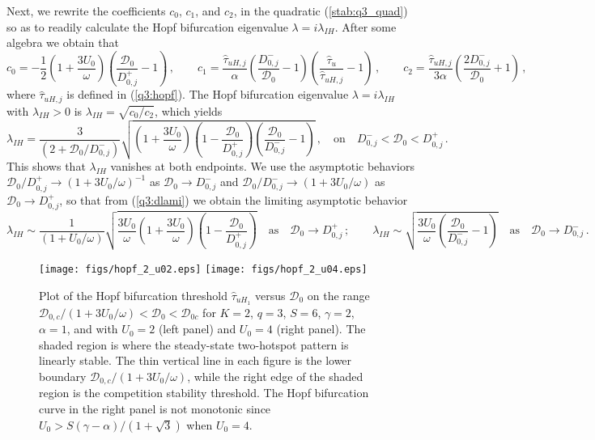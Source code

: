 \documentclass{article}%
\newcommand{\dzjp}{D^{+}_{0,j}}
\newcommand{\dzjm}{D^{-}_{0,j}}
\begin{document}
Next, we rewrite the coefficients $c_0$, $c_1$, and $c_2$, in the
quadratic (\ref{stab:q3_quad}) so as to readily calculate the Hopf
bifurcation eigenvalue $\lambda=i\lambda_{IH}$. After some algebra we
obtain that
\begin{equation}\label{q3:new_c0c1c2}
  c_0 = -\frac{1}{2}\left(1+\frac{3U_0}{\omega}\right)
   \left( \frac{{\mathcal D}_0}{\dzjp}-1\right) \,, \qquad
  c_1 = \frac{\hat{\tau}_{uH,j}}{\alpha} \left( \frac{\dzjm}{{\mathcal D}_0}
  -1 \right)\left( \frac{\hat{\tau}_u}{\hat{\tau}_{uH,j}} -1 \right) \,,
  \qquad c_2 = \frac{\hat{\tau}_{uH,j}}{3\alpha}
  \left(\frac{2\dzjm}{{\mathcal D}_0} + 1 \right) \,,
\end{equation}
where $\hat{\tau}_{uH,j}$ is defined in (\ref{q3:hopf}). The Hopf bifurcation
eigenvalue $\lambda=i\lambda_{IH}$ with $\lambda_{IH}>0$ is 
$\lambda_{IH}=\sqrt{c_0/c_2}$, which yields
\begin{equation}\label{q3:dlami}
   \lambda_{IH}=\frac{3}{\left(2 + {{\mathcal D}_0/\dzjm}\right)} 
  \sqrt{ \left( 1 + \frac{3U_0}{\omega}\right) 
    \left(1 - \frac{{\mathcal D}_0}{\dzjp}\right)
\left(\frac{{\mathcal D}_0}{\dzjm} -1 \right)}\,, \quad \mbox{on} \quad
   \dzjm < {\mathcal D}_0 < \dzjp \,.
\end{equation}
This shows that $\lambda_{IH}$ vanishes at both endpoints.  We use the
asymptotic behaviors ${{\mathcal D}_0/\dzjp}\to
\left(1+{3U_0/\omega}\right)^{-1}$ as ${\mathcal D}_0\to \dzjm$ and
${{\mathcal D}_0/\dzjm}\to \left(1+{3U_0/\omega}\right)$ as ${\mathcal
  D}_0\to \dzjp$, so that from (\ref{q3:dlami}) we obtain the limiting
asymptotic behavior
\begin{equation}\label{q3:lim_val}
   \lambda_{IH}\sim \frac{1}{\left(1 + {U_0/\omega}\right)}
  \sqrt{ \frac{3U_0}{\omega} \left( 1 + \frac{3U_0}{\omega}\right) 
    \left(1 - \frac{{\mathcal D}_0}{\dzjp}\right)} \quad \mbox{as}
 \quad {\mathcal D}_0\to \dzjp\,; \qquad
  \lambda_{IH}\sim \sqrt{ \frac{3U_0}{\omega} 
  \left( \frac{{\mathcal D}_0}{\dzjm}-1\right)} \quad \mbox{as} \quad
  {\mathcal D}_0\to \dzjm \,.
\end{equation}

\begin{figure}[htbp]
\centering
\texttt{[image: figs/hopf\_2\_u02.eps]}
\texttt{[image: figs/hopf\_2\_u04.eps]}
\caption{\label{fig:hopf_tau_2} Plot of the Hopf bifurcation threshold
  $\hat{\tau}_{uH_1}$ versus ${\mathcal D}_0$ on the range ${{\mathcal
      D}_{0,c}/(1+{3U_0/\omega})}<{\mathcal D}_0<{\mathcal D}_{0c}$
  for $K=2$, $q=3$, $S=6$, $\gamma=2$, $\alpha=1$, and with $U_0=2$
  (left panel) and $U_0=4$ (right panel). The shaded region is where
  the steady-state two-hotspot pattern is linearly stable. The thin
  vertical line in each figure is the lower boundary ${{\mathcal
      D}_{0,c}/(1+{3U_0/\omega})}$, while the right edge of the shaded
  region is the competition stability threshold.  The Hopf bifurcation
  curve in the right panel is not monotonic since
  $U_0>{S(\gamma-\alpha)/(1+\sqrt{3})}$ when $U_0=4$.}
\end{figure}
\end{document}
